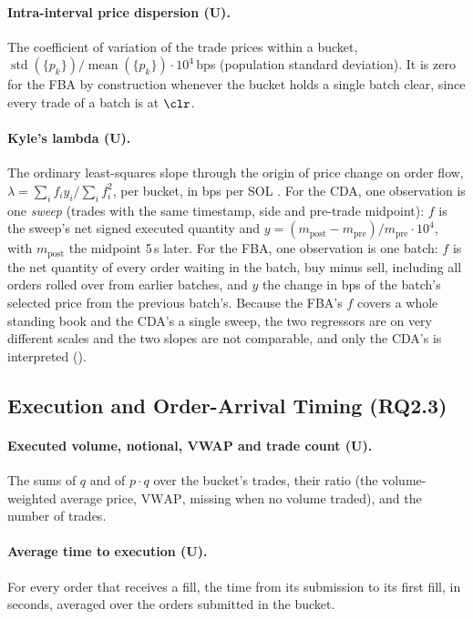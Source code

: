 \paragraph{Intra-interval price dispersion (U).} The coefficient of
variation of the trade prices within a bucket,
$\operatorname{std}(\{p_k\}) / \operatorname{mean}(\{p_k\}) \cdot
10^{4}$\,bps (population standard deviation). It is zero for the FBA by
construction whenever the bucket holds a single batch clear, since every
trade of a batch is at $\clr$.

\paragraph{Kyle's lambda (U).} The ordinary least-squares slope through
the origin of price change on order flow, $\lambda = \sum_i f_i y_i /
\sum_i f_i^2$, per bucket, in bps per SOL \citep{kyle1985continuous}. For
the CDA, one observation is one \emph{sweep} (trades with the same
timestamp, side and pre-trade midpoint): $f$ is the sweep's net signed
executed quantity and $y = (m_{\mathrm{post}} -
m_{\mathrm{pre}})/m_{\mathrm{pre}} \cdot 10^{4}$, with $m_{\mathrm{post}}$
the midpoint 5\,s later. For the FBA, one observation is one batch: $f$ is
the net quantity of every order waiting in the batch, buy minus sell,
including all orders rolled over from earlier batches, and $y$ the change
in bps of the batch's selected price from the previous batch's. Because
the FBA's $f$ covers a whole standing book and the CDA's a single sweep,
the two regressors are on very different scales and the two slopes are
not comparable, and only the CDA's is interpreted
().

\subsection{Execution and Order-Arrival Timing (RQ2.3)}
\label{sec:metrics23}

\paragraph{Executed volume, notional, VWAP and trade count (U).} The sums
of $q$ and of $p \cdot q$ over the bucket's trades, their ratio (the
volume-weighted average price, $\mathrm{VWAP}$, missing when no volume
traded), and the number of trades.

\paragraph{Average time to execution (U).} For every order that receives
a fill, the time from its submission to its first fill, in seconds,
averaged over the orders submitted in the bucket.

